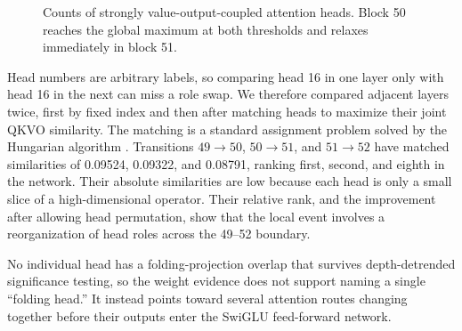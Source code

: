 \documentclass[11pt]{article}
\begin{document}
\begin{figure}[H]
\centering
{}
\caption{Counts of strongly value-output-coupled attention heads. Block 50 reaches the global maximum at both thresholds and relaxes immediately in block 51.}
\label{fig:attention}
\end{figure}

Head numbers are arbitrary labels, so comparing head 16 in one layer only with head 16 in the next can miss a role swap. We therefore compared adjacent layers twice, first by fixed index and then after matching heads to maximize their joint QKVO similarity. The matching is a standard assignment problem solved by the Hungarian algorithm \cite{kuhn1955}. Transitions $49\rightarrow50$, $50\rightarrow51$, and $51\rightarrow52$ have matched similarities of 0.09524, 0.09322, and 0.08791, ranking first, second, and eighth in the network. Their absolute similarities are low because each head is only a small slice of a high-dimensional operator. Their relative rank, and the improvement after allowing head permutation, show that the local event involves a reorganization of head roles across the 49--52 boundary.

No individual head has a folding-projection overlap that survives depth-detrended significance testing, so the weight evidence does not support naming a single ``folding head.'' It instead points toward several attention routes changing together before their outputs enter the SwiGLU feed-forward network.
\end{document}
